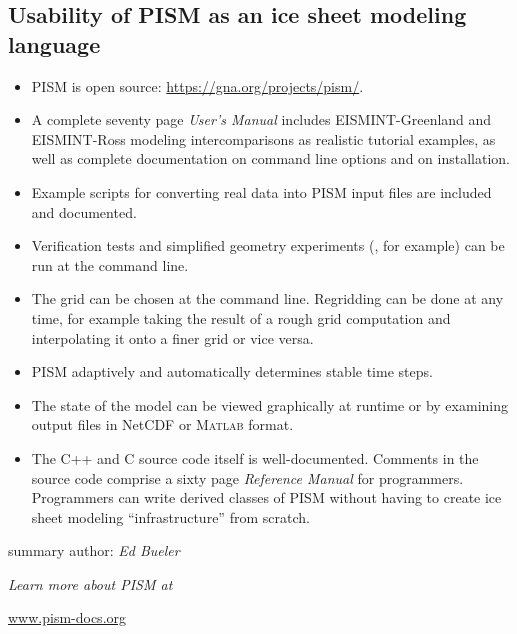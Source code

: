 \documentclass[12pt,final]{amsart}
\newcommand{\Matlab}{\textsc{Matlab}\xspace}
\begin{document}
\subsection*{Usability of PISM as an ice sheet modeling language}  \begin{itemize}
\item PISM is open source: \url{https://gna.org/projects/pism/}.
\item A complete seventy page \emph{User's Manual} includes EISMINT-Greenland \citep{RitzEISMINT} and EISMINT-Ross \citep{MacAyealetal} modeling intercomparisons as realistic tutorial examples, as well as complete documentation on command line options and on installation.
\item Example scripts for converting real data into PISM input files are included and documented.
\item Verification tests and simplified geometry experiments (\citep{EISMINT00}, for example) can be run at the command line.
\item The grid can be chosen at the command line.  Regridding can be done at any time, for example taking the result of a rough grid computation and interpolating it onto a finer grid or vice versa.
\item PISM adaptively and automatically determines stable time steps.
\item The state of the model can be viewed graphically at runtime or by examining output files in NetCDF or \Matlab format.
\item The C++ and C source code itself is well-documented.  Comments in the source code comprise a sixty page \emph{Reference Manual} for programmers.  Programmers can write derived classes of PISM without having to create ice sheet modeling ``infrastructure'' from scratch.
\end{itemize}

\small

%

\normalsize

\vfill
\noindent summary author: \emph{Ed Bueler}

\vfill
\noindent \emph{Learn more about PISM at}

\centerline{\href{http://www.pism-docs.org/}{www.pism-docs.org}}
\end{document}
